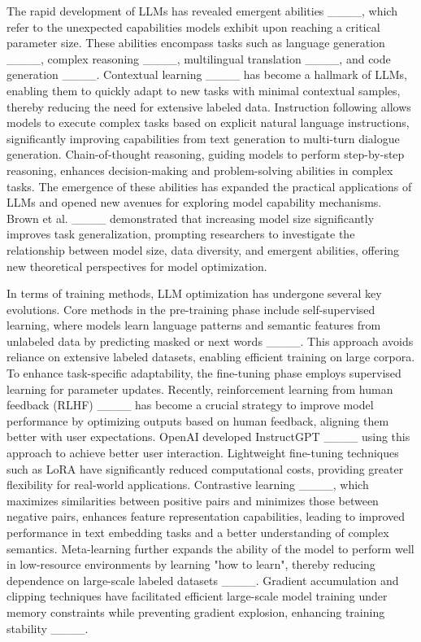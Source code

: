 The rapid development of LLMs has revealed emergent abilities ____, which refer to the unexpected capabilities models exhibit upon reaching a critical parameter size. These abilities encompass tasks such as language generation ____, complex reasoning ____, multilingual translation ____, and code generation ____. Contextual learning ____ has become a hallmark of LLMs, enabling them to quickly adapt to new tasks with minimal contextual samples, thereby reducing the need for extensive labeled data. Instruction following allows models to execute complex tasks based on explicit natural language instructions, significantly improving capabilities from text generation to multi-turn dialogue generation. Chain-of-thought reasoning, guiding models to perform step-by-step reasoning, enhances decision-making and problem-solving abilities in complex tasks. The emergence of these abilities has expanded the practical applications of LLMs and opened new avenues for exploring model capability mechanisms. Brown et al. ____ demonstrated that increasing model size significantly improves task generalization, prompting researchers to investigate the relationship between model size, data diversity, and emergent abilities, offering new theoretical perspectives for model optimization.



In terms of training methods, LLM optimization has undergone several key evolutions. Core methods in the pre-training phase include self-supervised learning, where models learn language patterns and semantic features from unlabeled data by predicting masked or next words ____. This approach avoids reliance on extensive labeled datasets, enabling efficient training on large corpora. To enhance task-specific adaptability, the fine-tuning phase employs supervised learning for parameter updates. Recently, reinforcement learning from human feedback (RLHF) ____ has become a crucial strategy to improve model performance by optimizing outputs based on human feedback, aligning them better with user expectations. OpenAI developed InstructGPT ____ using this approach to achieve better user interaction. Lightweight fine-tuning techniques such as LoRA have significantly reduced computational costs, providing greater flexibility for real-world applications. Contrastive learning ____, which maximizes similarities between positive pairs and minimizes those between negative pairs, enhances feature representation capabilities, leading to improved performance in text embedding tasks and a better understanding of complex semantics. Meta-learning further expands the ability of the model to perform well in low-resource environments by learning "how to learn", thereby reducing dependence on large-scale labeled datasets ____. Gradient accumulation and clipping techniques have facilitated efficient large-scale model training under memory constraints while preventing gradient explosion, enhancing training stability ____.



